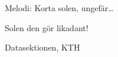 \begin{song}

\begin{songmeta}
Melodi: Korta solen, ungefär\ldots
\end{songmeta}

\begin{songtext}
Solen den gör likadant!
\end{songtext}

\begin{songnotes}
Datasektionen, KTH
\end{songnotes}

\end{song}
